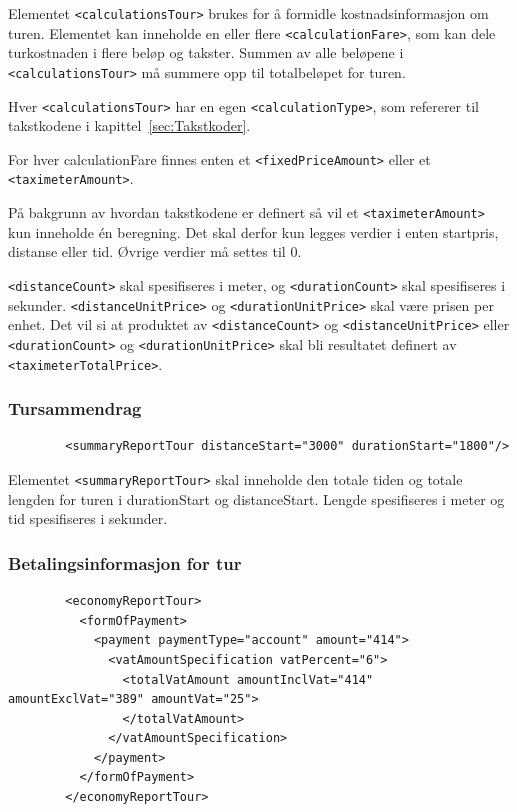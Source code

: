 \documentclass[a4paper,titlepage,norsk,11pt]{article}
\begin{document}
Elementet \lstinline{<calculationsTour>} brukes for å formidle kostnadsinformasjon om turen. Elementet kan inneholde en eller flere \lstinline{<calculationFare>}, som kan dele turkostnaden i flere beløp og takster. Summen av alle beløpene i \lstinline{<calculationsTour>} må summere opp til totalbeløpet for turen.

Hver \lstinline{<calculationsTour>} har en egen \lstinline{<calculationType>}, som refererer til takstkodene i kapittel~\ref{sec:Takstkoder}.

For hver calculationFare finnes enten et \lstinline{<fixedPriceAmount>} eller et \lstinline{<taximeterAmount>}.

På bakgrunn av hvordan takstkodene er definert så vil et \lstinline{<taximeterAmount>} kun inneholde én beregning. Det skal derfor kun legges verdier i enten startpris, distanse eller tid. Øvrige verdier må settes til 0.

\lstinline{<distanceCount>} skal spesifiseres i meter, og \lstinline{<durationCount>} skal spesifiseres i sekunder. \lstinline{<distanceUnitPrice>} og \lstinline{<durationUnitPrice>} skal være prisen per enhet. Det vil si at produktet av \lstinline{<distanceCount>} og \lstinline{<distanceUnitPrice>} eller \lstinline{<durationCount>} og \lstinline{<durationUnitPrice>} skal bli resultatet definert av \lstinline{<taximeterTotalPrice>}.

\subsubsection{Tursammendrag}

\begin{lstlisting}
        <summaryReportTour distanceStart="3000" durationStart="1800"/>
\end{lstlisting}

Elementet \lstinline{<summaryReportTour>} skal inneholde den totale tiden og totale lengden for turen i durationStart og distanceStart. Lengde spesifiseres i meter og tid spesifiseres i sekunder.

\subsubsection{Betalingsinformasjon for tur}

\begin{lstlisting}
        <economyReportTour>
          <formOfPayment>
            <payment paymentType="account" amount="414">
              <vatAmountSpecification vatPercent="6">
                <totalVatAmount amountInclVat="414" amountExclVat="389" amountVat="25">
                </totalVatAmount>
              </vatAmountSpecification>
            </payment>
          </formOfPayment>
        </economyReportTour>
\end{lstlisting}
\end{document}
